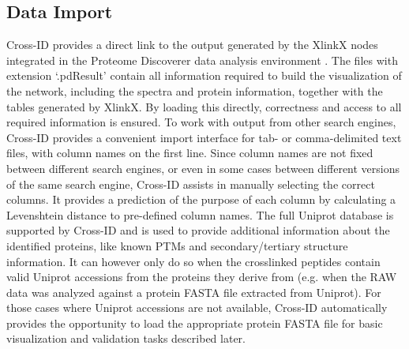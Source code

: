 \subsection{Data Import}
Cross-ID provides a direct link to the output generated by the XlinkX nodes integrated in the Proteome Discoverer data analysis environment \cite{klykov2018efficient}. The files with extension ‘.pdResult’ contain all information required to build the visualization of the network, including the spectra and protein information, together with the tables generated by XlinkX. By loading this directly, correctness and access to all required information is ensured. To work with output from other search engines, Cross-ID provides a convenient import interface for tab- or comma-delimited text files, with column names on the first line. Since column names are not fixed between different search engines, or even in some cases between different versions of the same search engine, Cross-ID assists in manually selecting the correct columns. It provides a prediction of the purpose of each column by calculating a Levenshtein distance \cite{levenstein1966binary} to pre-defined column names.
The full Uniprot database \cite{bateman2017uniprot:} is supported by Cross-ID and is used to provide additional information about the identified proteins, like known PTMs and secondary/tertiary structure information. It can however only do so when the crosslinked peptides contain valid Uniprot accessions from the proteins they derive from (e.g. when the RAW data was analyzed against a protein FASTA file extracted from Uniprot). For those cases where Uniprot accessions are not available, Cross-ID automatically provides the opportunity to load the appropriate protein FASTA file for basic visualization and validation tasks described later.



